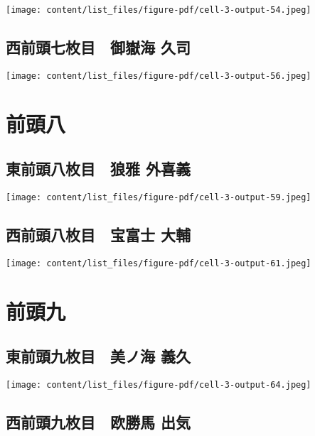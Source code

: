 \documentclass[
  letterpaper,
]{bxjsbook}
\begin{document}
\texttt{[image: content/list\_files/figure-pdf/cell-3-output-54.jpeg]}

\subsection{西前頭七枚目　御嶽海
久司}\label{ux897fux524dux982dux4e03ux679aux76ee-ux5fa1ux5dbdux6d77-ux4e45ux53f8}

\texttt{[image: content/list\_files/figure-pdf/cell-3-output-56.jpeg]}

\section{前頭八}\label{ux524dux982dux516b}

\subsection{東前頭八枚目　狼雅
外喜義}\label{ux6771ux524dux982dux516bux679aux76ee-ux72fcux96c5-ux5916ux559cux7fa9}

\texttt{[image: content/list\_files/figure-pdf/cell-3-output-59.jpeg]}

\subsection{西前頭八枚目　宝富士
大輔}\label{ux897fux524dux982dux516bux679aux76ee-ux5b9dux5bccux58eb-ux5927ux8f14}

\texttt{[image: content/list\_files/figure-pdf/cell-3-output-61.jpeg]}

\section{前頭九}\label{ux524dux982dux4e5d}

\subsection{東前頭九枚目　美ノ海
義久}\label{ux6771ux524dux982dux4e5dux679aux76ee-ux7f8eux30ceux6d77-ux7fa9ux4e45}

\texttt{[image: content/list\_files/figure-pdf/cell-3-output-64.jpeg]}

\subsection{西前頭九枚目　欧勝馬
出気}\label{ux897fux524dux982dux4e5dux679aux76ee-ux6b27ux52ddux99ac-ux51faux6c17}
\end{document}
